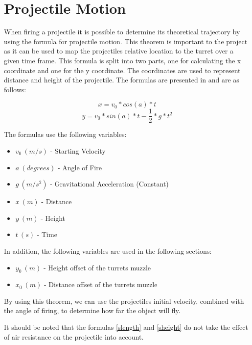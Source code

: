 \section{Projectile Motion}\label{ProjMotion}
When firing a projectile it is possible to determine its theoretical trajectory
by using the formula for projectile motion. This theorem is important to the
project as it can be used to map the projectiles relative location to the turret
over a given time frame. This formula is split into two parts, one for
calculating the x coordinate and one for the y coordinate. The coordinates are
used to represent distance and height of the projectile. The formulas are
presented in \citep[Ch. 6.2]{OrbitBA} and are as follows:

\begin{equation}\label{slength}
x=v_0*cos(a)*t
\end{equation}
\begin{equation}\label{sheight}
y=v_0*sin(a)*t-\frac{1}{2}*g*t^2
\end{equation}

The formulas use the following variables:
\begin{itemize}
  \item $v_0\ (m/s)$ - Starting Velocity
  \item $a\ (degrees)$ - Angle of Fire
  \item $g\ (m/s^2)$ - Gravitational Acceleration (Constant)
  \item $x\ (m)$ - Distance
  \item $y\ (m)$ - Height
  \item $t\ (s)$ - Time
\end{itemize}
In addition, the following variables are used in the following sections:
\begin{itemize}
  \item $y_0\ (m)$ - Height offset of the turrets muzzle
  \item $x_0\ (m)$ - Distance offset of the turrets muzzle
\end{itemize}

By using this theorem, we can use the projectiles initial velocity, combined
with the angle of firing, to determine how far the object will fly.\nl

It should be noted that the formulas \autoref{slength} and \autoref{sheight} do
not take the effect of air resistance on the projectile into account. 


